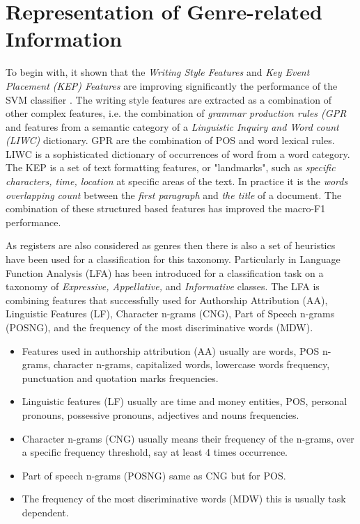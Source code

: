 \section{Representation of Genre-related Information}

To begin with, it shown that the \textit{Writing Style Features} and \textit{Key Event Placement (KEP) Features} are improving significantly the performance of the SVM classifier \parencite{dai2018fine}.  The writing style features are extracted as a combination of  other complex features, i.e. the combination of \textit{grammar production rules (GPR} and features from a semantic category of a \textit{Linguistic Inquiry and Word count (LIWC)} dictionary. GPR are the combination of POS and word lexical rules. LIWC is a sophisticated dictionary of occurrences of word from a word category. The KEP is a set of text formatting features, or "landmarks", such as \textit{specific characters, time, location} at specific areas of the text. In practice it is the \textit{words overlapping count} between the \textit{first paragraph} and \textit{the title} of a document. The combination of these structured based features has improved the macro-F1 performance.

As registers are also considered as genres then there is also a set of heuristics have been used for a classification for this taxonomy. Particularly in \parencite{onan2018ensemble} Language Function Analysis (LFA) has been introduced for a classification task on a taxonomy of \textit{Expressive, Appellative,} and \textit{Informative} classes. The LFA is combining features that successfully used for Authorship Attribution (AA), Linguistic Features (LF), Character n-grams (CNG), Part of Speech n-grams (POSNG), and the frequency of the most discriminative words (MDW). 

\begin{itemize}
\item Features used in authorship attribution (AA) usually are words, POS n-grams, character n-grams, capitalized words, lowercase words frequency, punctuation and quotation marks frequencies. 
\item Linguistic features (LF) usually are time and money entities, POS, personal pronouns, possessive pronouns, adjectives and nouns frequencies. 
\item Character n-grams (CNG) usually means their frequency of the n-grams, over a specific frequency threshold, say at least 4 times occurrence. 
\item Part of speech n-grams (POSNG) same as CNG but for POS.
\item The frequency of the most discriminative words (MDW) this is usually task dependent.
\end{itemize}

